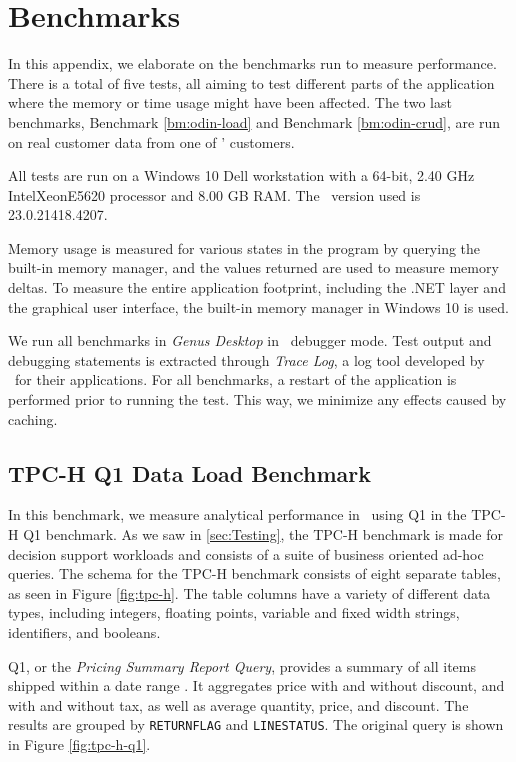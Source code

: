 \chapter{Benchmarks}
\label{app:Benchmarks}
In this appendix, we elaborate on the benchmarks run to measure performance. There is a total of five tests, all aiming to test different parts of the application where the memory or time usage might have been affected. The two last benchmarks, Benchmark \ref{bm:odin-load} and Benchmark \ref{bm:odin-crud}, are run on real customer data from one of \genus' customers.

All tests are run on a Windows 10 Dell workstation with a 64-bit, 2.40 GHz Intel\textregistered Xeon\textregistered E5620 processor and 8.00 GB RAM. The \delphi~version used is 23.0.21418.4207. 

Memory usage is measured for various states in the program by querying the built-in  memory manager, and the values returned are used to measure memory deltas. To measure the entire application footprint, including the .NET layer and the graphical user interface, the built-in memory manager in Windows 10 is used.

We run all benchmarks in \textit{Genus Desktop} in \delphi~debugger mode. Test output and debugging statements is extracted through \textit{Trace Log}, a log tool developed by \genus~for their applications. For all benchmarks, a restart of the application is performed prior to running the test. This way, we minimize any effects caused by caching.

\section{TPC-H Q1 Data Load Benchmark}
\label{bm:q1}
In this benchmark, we measure analytical performance in \gap~using Q1 in the TPC-H Q1 benchmark. As we saw in \ref{sec:Testing}, the TPC-H benchmark is made for decision support workloads and consists of a suite of business oriented ad-hoc queries. The schema for the TPC-H benchmark consists of eight separate tables, as seen in Figure \ref{fig:tpc-h}. The table columns have a variety of different data types, including integers, floating points, variable and fixed width strings, identifiers, and booleans. 

Q1, or the \textit{Pricing Summary Report Query}, provides a summary of all items shipped within a date range \cite{Transaction_Processing_Performance_Council_TPC2014-ux}. It aggregates price with and without discount, and with and without tax, as well as average quantity, price, and discount. The results are grouped by \texttt{RETURNFLAG} and \texttt{LINESTATUS}. The original query is shown in Figure \ref{fig:tpc-h-q1}.

